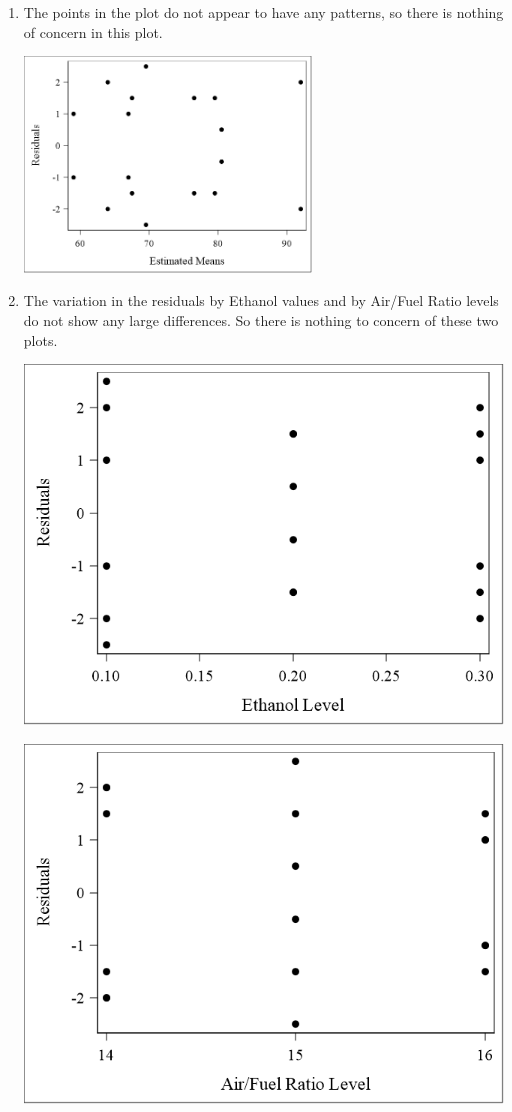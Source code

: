 \documentclass{article}
\begin{document}
\begin{enumerate}[leftmargin = 0 em, label = \arabic*., font = \bfseries]
\begin{enumerate}
\item 
The points in the plot do not appear to have any patterns, so there is nothing of concern in this plot.
\begin{center}
\includegraphics[width = 0.6\textwidth]{resem.png}
\end{center}


\item 
The variation in the residuals by Ethanol values and by Air/Fuel Ratio levels do not show any large differences. So there is nothing to concern of these two plots.

\begin{minipage}{0.5\textwidth}
	\begin{center}
		\includegraphics[width = 0.7\linewidth]{rese.png}
	\end{center}
\end{minipage}
\hspace{-4em}
\begin{minipage}{0.5\textwidth}
	\begin{center}
		\includegraphics[width = 0.7\linewidth]{resaf.png}
	\end{center}
\end{minipage}



\end{enumerate}
\end{enumerate}
\end{document}
